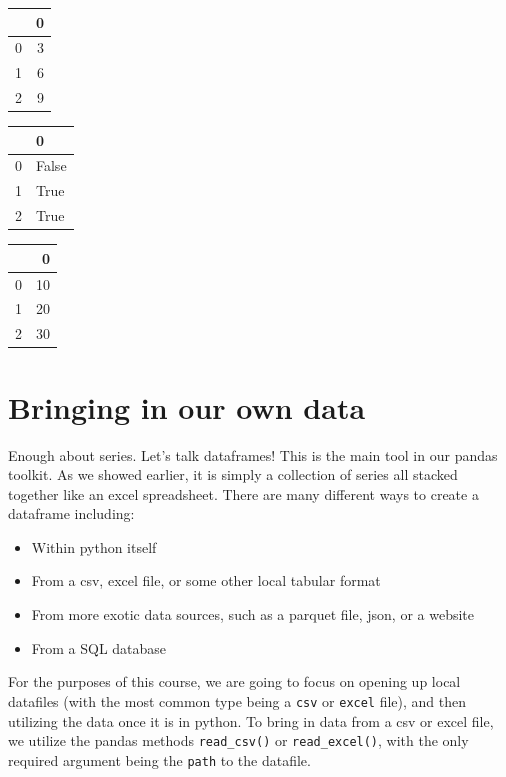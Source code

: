 \documentclass[
  letterpaper,
  DIV=11,
  numbers=noendperiod]{scrreprt}
\providecommand{\tightlist}{%
  \setlength{\itemsep}{0pt}\setlength{\parskip}{0pt}}\usepackage{longtable,booktabs,array}
\begin{document}
\begin{tabular}{lr}
\toprule
{} &  0 \\
\midrule
0 &  3 \\
1 &  6 \\
2 &  9 \\
\bottomrule
\end{tabular}

\begin{tabular}{ll}
\toprule
{} &      0 \\
\midrule
0 &  False \\
1 &   True \\
2 &   True \\
\bottomrule
\end{tabular}

\begin{tabular}{lr}
\toprule
{} &   0 \\
\midrule
0 &  10 \\
1 &  20 \\
2 &  30 \\
\bottomrule
\end{tabular}

\hypertarget{bringing-in-our-own-data}{%
\section{Bringing in our own data}\label{bringing-in-our-own-data}}

Enough about series. Let's talk dataframes! This is the main tool in our
pandas toolkit. As we showed earlier, it is simply a collection of
series all stacked together like an excel spreadsheet. There are many
different ways to create a dataframe including:

\begin{itemize}
\tightlist
\item
  Within python itself
\item
  From a csv, excel file, or some other local tabular format
\item
  From more exotic data sources, such as a parquet file, json, or a
  website
\item
  From a SQL database
\end{itemize}

For the purposes of this course, we are going to focus on opening up
local datafiles (with the most common type being a \texttt{csv} or
\texttt{excel} file), and then utilizing the data once it is in python.
To bring in data from a csv or excel file, we utilize the pandas methods
\texttt{read\_csv()} or \texttt{read\_excel()}, with the only required
argument being the \texttt{path} to the datafile.
\end{document}
